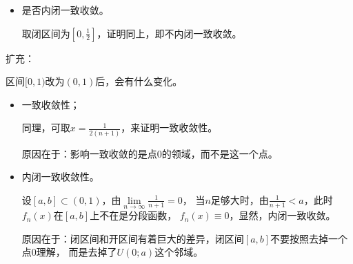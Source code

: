\documentclass{article}
\begin{document}
\begin{itemize}
\begin{itemize}
                取$x = \frac{1}{2(n + 1)}$，有
                \begin{align*}
                  |f_n(x) - f(x)|
                   & = \left|-(n+1) \frac{1}{2(n + 1)} + 1\right| \\
                   & = \left|-\frac{1}{2} + 1\right|              \\
                   & = \frac{1}{2}
                \end{align*}
                由上确界的定义可知，
                \begin{align*}
                  \sup\limits_{x \in [0, 1)} |f_n(x) - f(x)| \geq \frac{1}{2}
                \end{align*}
                所以由保不等式性
                \begin{align*}
                  \lim\limits_{n \to \infty} \sup\limits_{x \in [0, 1)} |f_n(x) - f(x)| \neq 0
                \end{align*}
                故不一致收敛。

          \item 是否内闭一致收敛。

                取闭区间为$[0, \frac{1}{2}]$，证明同上，即不内闭一致收敛。
        \end{itemize}

        \begin{zremark}
          扩充：

          区间$[0, 1)$改为$(0, 1)$后，会有什么变化。
        \end{zremark}

        \begin{itemize}
          \item 一致收敛性；

                同理，可取$x = \frac{1}{2(n + 1)}$，来证明一致收敛性。

                原因在于：影响一致收敛的是点$0$的领域，而不是这一个点。

          \item 内闭一致收敛性。

                设$[a, b] \subset (0, 1)$，由$\lim\limits_{n \to \infty} \frac{1}{n + 1} = 0$，
                当$n$足够大时，由$\frac{1}{n + 1} < a$，此时$f_n(x)$在$[a, b]$上不在是分段函数，
                $f_n(x) \equiv 0$，显然，内闭一致收敛。

                原因在于：闭区间和开区间有着巨大的差异，闭区间$[a, b]$不要按照去掉一个点$0$理解，
                而是去掉了$U(0; a)$这个邻域。
        \end{itemize}


\end{itemize}
\end{document}
